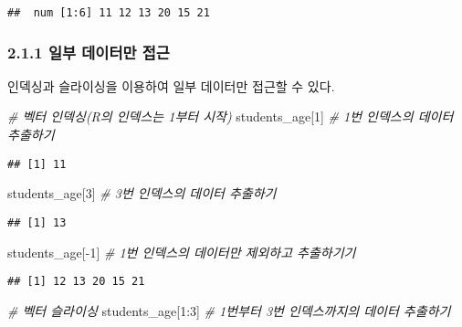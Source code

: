 \documentclass[
]{article}
\newenvironment{Shaded}{\begin{snugshade}}{\end{snugshade}}
\newcommand{\CommentTok}[1]{\textcolor[rgb]{0.56,0.35,0.01}{\textit{#1}}}
\newcommand{\DecValTok}[1]{\textcolor[rgb]{0.00,0.00,0.81}{#1}}
\newcommand{\NormalTok}[1]{#1}
\newcommand{\SpecialCharTok}[1]{\textcolor[rgb]{0.00,0.00,0.00}{#1}}
\begin{document}
\begin{verbatim}
##  num [1:6] 11 12 13 20 15 21
\end{verbatim}

\hypertarget{uxc77cuxbd80-uxb370uxc774uxd130uxb9cc-uxc811uxadfc}{%
\subsubsection{2.1.1 일부 데이터만
접근}\label{uxc77cuxbd80-uxb370uxc774uxd130uxb9cc-uxc811uxadfc}}

인덱싱과 슬라이싱을 이용하여 일부 데이터만 접근할 수 있다.

\begin{Shaded}
\begin{Highlighting}[]
\CommentTok{\# 벡터 인덱싱(R의 인덱스는 1부터 시작)}
\NormalTok{students\_age[}\DecValTok{1}\NormalTok{]  }\CommentTok{\# 1번 인덱스의 데이터 추출하기}
\end{Highlighting}
\end{Shaded}

\begin{verbatim}
## [1] 11
\end{verbatim}

\begin{Shaded}
\begin{Highlighting}[]
\NormalTok{students\_age[}\DecValTok{3}\NormalTok{]  }\CommentTok{\# 3번 인덱스의 데이터 추출하기}
\end{Highlighting}
\end{Shaded}

\begin{verbatim}
## [1] 13
\end{verbatim}

\begin{Shaded}
\begin{Highlighting}[]
\NormalTok{students\_age[}\SpecialCharTok{{-}}\DecValTok{1}\NormalTok{]  }\CommentTok{\# 1번 인덱스의 데이터만 제외하고 추출하기기}
\end{Highlighting}
\end{Shaded}

\begin{verbatim}
## [1] 12 13 20 15 21
\end{verbatim}

\begin{Shaded}
\begin{Highlighting}[]
\CommentTok{\# 벡터 슬라이싱}
\NormalTok{students\_age[}\DecValTok{1}\SpecialCharTok{:}\DecValTok{3}\NormalTok{]  }\CommentTok{\# 1번부터 3번 인덱스까지의 데이터 추출하기}
\end{Highlighting}
\end{Shaded}
\end{document}
